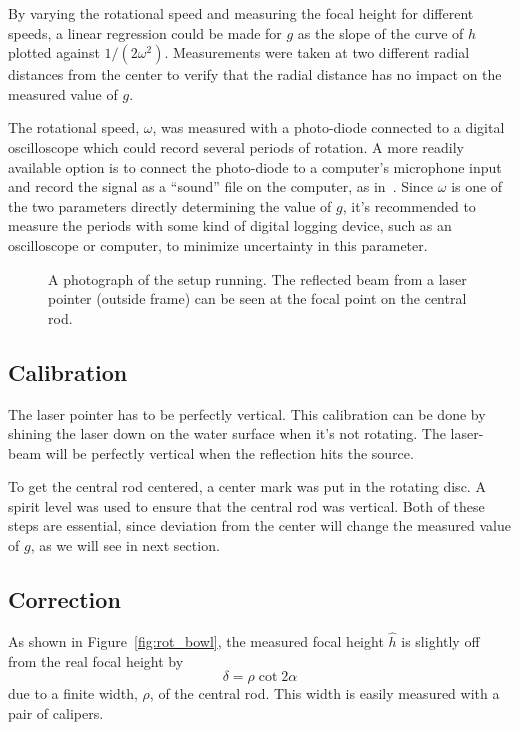 \documentclass[12pt, a4paper, twocolumn]{article}
\begin{document}
By varying the rotational speed and measuring the focal height for different speeds, a linear regression could be made for $g$ as the slope of the curve of $h$ plotted against $1/(2\omega^2)$.  Measurements were taken at two different radial distances from the center to verify that the radial distance has no impact on the measured value of $g$. 

The rotational speed, $\omega$, was measured with a photo-diode connected to a digital oscilloscope which could record several periods of rotation. A more readily available option is to connect the photo-diode to a computer's microphone input and record the signal as a ``sound'' file on the computer, as in~\cite{Sabatka2010}. Since $\omega$ is one of the two parameters directly determining the value of $g$, it's recommended to measure the periods with some kind of digital logging device, such as an oscilloscope or computer, to minimize uncertainty in this parameter.

\begin{figure}
\centering
\resizebox{6cm}{!}{}
\caption{A photograph of the setup running. The reflected beam from a laser pointer (outside frame) can be seen at the focal point on the central rod. %
} 
\label{fig:rot_bowl_pic} 
\end{figure}


\subsection{Calibration}

The laser pointer has to be perfectly vertical. This calibration can be done by shining the laser down on the water surface when it's not rotating. The laser-beam will be perfectly vertical when the reflection hits the source.

To get the central rod centered, a center mark was put in the rotating disc. A spirit level was used to ensure that the central rod was vertical. Both of these steps are essential, since deviation from the center will change the measured value of $g$, as we will see in next section. 


\subsection{Correction}\label{sec:corrections}

As shown in Figure~\ref{fig:rot_bowl}, the measured focal height $\hat{h}$ is slightly off from the real focal height by 
\begin{equation}%
\delta=\rho\cot 2\alpha
\end{equation}
due to a finite width, $\rho$, of the central rod. This width is easily measured with a pair of calipers.
\end{document}
